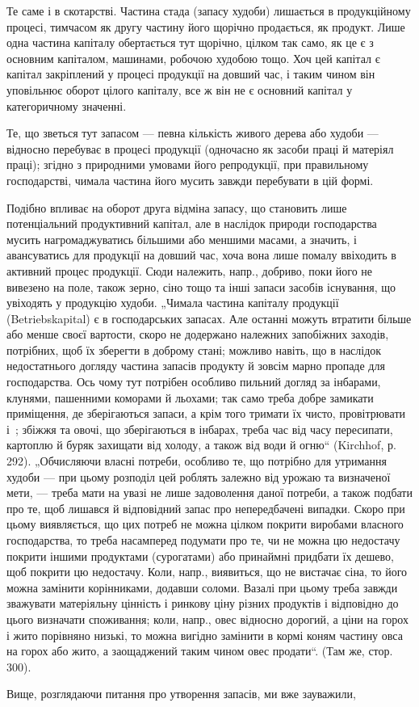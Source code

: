 
Те саме і в скотарстві. Частина стада (запасу худоби) лишається в продукційному процесі, тимчасом як
другу частину його щорічно продається, як продукт. Лише одна частина капіталу обертається тут
щорічно, цілком так само, як це є з основним капіталом, машинами, робочою худобою тощо. Хоч цей
капітал є капітал закріплений у процесі продукції на довший час, і таким чином він уповільнює оборот
цілого капіталу, все ж він не є основний капітал у категоричному значенні.

Те, що зветься тут запасом — певна кількість живого дерева або худоби — відносно перебуває в процесі
продукції (одночасно як засоби праці й матеріял праці); згідно з природними умовами його
репродукції, при правильному господарстві, чимала частина його мусить завжди перебувати в цій формі.

Подібно впливає на оборот друга відміна запасу, що становить лише потенціальний продуктивний
капітал, але в наслідок природи господарства мусить нагромаджуватись більшими або меншими масами, а
значить, і авансуватись для продукції на довший час, хоча вона лише помалу ввіходить в активний
процес продукції. Сюди належить, напр., добриво, поки його не вивезено на поле, також зерно, сіно
тощо та інші запаси засобів існування, що увіходять у продукцію худоби. „Чимала частина капіталу
продукції (Betriebskapital) є в господарських запасах. Але останні можуть втратити більше або менше
своєї вартости, скоро не додержано належних запобіжних заходів, потрібних, щоб їх зберегти в доброму
стані; можливо навіть, що в наслідок недостатнього догляду частина запасів продукту й зовсім марно
пропаде для господарства. Ось чому тут потрібен особливо пильний догляд за інбарами, клунями,
пашенними коморами й льохами; так само треба добре замикати приміщення, де зберігаються запаси, а
крім того тримати їх чисто, провітрювати і~; збіжжя та овочі, що зберігаються в інбарах, треба
час від часу пересипати, картоплю й буряк захищати від холоду, а також від води й огню“ (Kirchhof,
р. 292). „Обчисляючи власні потреби, особливо те, що потрібно для утримання худоби — при цьому
розподіл цей роблять залежно від урожаю та визначеної мети, — треба мати на увазі не лише
задоволення даної потреби, а також подбати про те, щоб лишався й відповідний запас про непередбачені
випадки. Скоро при цьому виявляється, що цих потреб не можна цілком покрити виробами власного
господарства, то треба насамперед подумати про те, чи не можна цю недостачу покрити іншими
продуктами (сурогатами) або принаймні придбати їх дешево, щоб покрити цю недостачу. Коли, напр.,
виявиться, що не вистачає сіна, то його можна замінити корінниками, додавши соломи. Вазалі при цьому
треба завжди зважувати матеріяльну цінність і ринкову ціну різних продуктів і відповідно до цього
визначати споживання; коли, напр., овес відносно дорогий, а ціни на горох і жито порівняно низькі,
то можна вигідно замінити в кормі коням частину овса на горох або жито, а заощаджений таким чином
овес продати“. (Там же, стор. 300).

Вище, розглядаючи питання про утворення запасів, ми вже зауважили,
\parbreak{}  %
